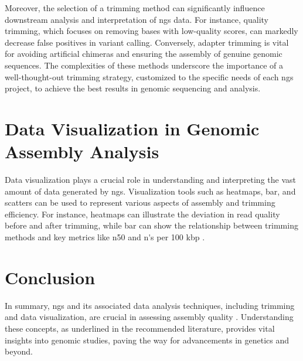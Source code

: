 Moreover, the selection of a \gls{trimming} method can significantly influence downstream analysis and interpretation of \gls{ngs} data. For instance, quality trimming, which focuses on removing bases with low-quality scores, can markedly decrease false positives in variant calling. Conversely, adapter trimming is vital for avoiding artificial chimeras and ensuring the assembly of genuine genomic sequences. The complexities of these methods underscore the importance of a well-thought-out \gls{trimming} strategy, customized to the specific needs of each \gls{ngs} project, to achieve the best results in genomic \gls{sequencing} and analysis.

\section{Data Visualization in Genomic Assembly Analysis}

Data visualization \cite{Chen2007} plays a crucial role in understanding and interpreting the vast amount of data generated by \gls{ngs}.  Visualization tools such as \gls{heatmap}s, \gls{bar}, and \gls{scatter}s can be used to represent various aspects of \gls{assembly} and \gls{trimming} efficiency. For instance, \gls{heatmap}s can illustrate the \gls{deviation} in \gls{read} quality before and after \gls{trimming}, while \gls{bar} can show the relationship between trimming methods and key \gls{metrics} like \gls{n50} and \gls{n's per 100 kbp} \cite{quast}.

\section{Conclusion}

In summary, \gls{ngs} and its associated data analysis techniques, including \gls{trimming} and data visualization, are crucial in assessing \gls{assembly} quality \cite{Wang2022}. Understanding these concepts, as underlined in the recommended literature, provides vital insights into genomic studies, paving the way for advancements in genetics and beyond.
